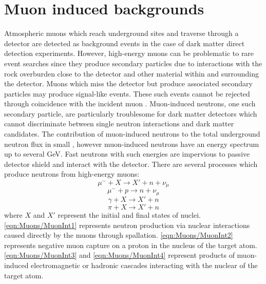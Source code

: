 \section{Muon induced backgrounds}\label{sec:Muons/InducedBackgrounds}
Atmospheric muons which reach underground sites and traverse through a detector are detected as background events in the case of dark matter direct detection experiments. However, high-energy muons can be problematic to rare event searches since they produce secondary particles due to interactions with the rock overburden close to the detector and other material within and surrounding the detector. Muons which miss the detector but produce associated secondary particles may produce signal-like events. These such events cannot be rejected through coincidence with the incident muon \cite{mei,Lindote:2008nq}. Muon-induced neutrons, one such secondary particle, are particularly troublesome for dark matter detectors which cannot discriminate between single neutron interactions and dark matter candidates. The contribution of muon-induced neutrons to the total underground neutron flux in small \cite{LZ_SIMS}, however muon-induced neutrons have an energy spectrum up to several GeV. Fast neutrons with such energies are impervious to passive detector shield and interact with the detector. There are several processes which produce neutrons from high-energy muons:
\begin{equation}\label{eqn:Muons/MuonInt1}
    \mu^-+X\rightarrow X' + n+\nu_\mu
\end{equation}
\begin{equation}\label{eqn:Muons/MuonInt2}
    \mu^-+p\rightarrow n+\nu_\mu
\end{equation}
\begin{equation}\label{eqn:Muons/MuonInt3}
    \gamma+X\rightarrow X'+n
\end{equation}
\begin{equation}\label{eqn:Muons/MuonInt4}
    \pi+X\rightarrow X'+n
\end{equation} 
where $X$ and $X'$ represent the initial and final states of nuclei. \autoref{eqn:Muons/MuonInt1} represents neutron production via nuclear interactions caused directly by the muons through spallation. \autoref{eqn:Muons/MuonInt2} represents negative muon capture on a proton in the nucleus of the target atom. \autoref{eqn:Muons/MuonInt3} and \autoref{eqn:Muons/MuonInt4} represent products of muon-induced electromagnetic or hadronic cascades interacting with the nuclear of the target atom.
